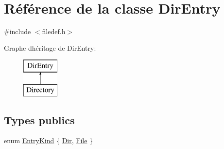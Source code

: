 \hypertarget{class_dir_entry}{}\section{Référence de la classe Dir\+Entry}
\label{class_dir_entry}


{\ttfamily \#include $<$filedef.\+h$>$}

Graphe d\textquotesingle{}héritage de Dir\+Entry\+:\begin{figure}[H]
\begin{center}
\leavevmode
\includegraphics[height=2.000000cm]{class_dir_entry}
\end{center}
\end{figure}
\subsection*{Types publics}
\begin{DoxyCompactItemize}
\item 
enum \hyperlink{class_dir_entry_a1edafe219ba585326221f2fbe66afaf0}{Entry\+Kind} \{ \hyperlink{class_dir_entry_a1edafe219ba585326221f2fbe66afaf0adb72b865ffffd17624eaac9e129e81e7}{Dir}, 
\hyperlink{class_dir_entry_a1edafe219ba585326221f2fbe66afaf0a275016310e0fac0f6fea318363c17fab}{File}
 \}
\end{DoxyCompactItemize}
